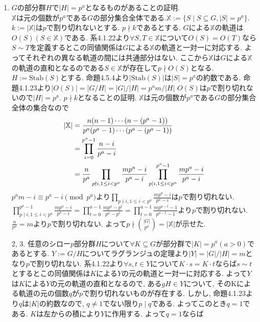 \documentclass[dvipdfmx]{jsarticle}
\theoremstyle{definition}
\numberwithin{equation}{section}
\numberwithin{props}{section}
\numberwithin{definition}{section}
\numberwithin{note}{section}
\newcommand{\XX}{\mathbb{X}}
\newcommand{\Stab}{\mathrm{Stab}}
\begin{document}
\begin{enumerate}
     \item $G$の部分群$H$で$\lvert H\rvert=p^a$となるものがあることの証明.\\
     $\XX$は元の個数が$p^a$である$G$の部分集合全体である.$\XX:=\lbrace S\mid S\subseteq G,\lvert S\rvert=p^a\rbrace$.
     $k := \lvert \XX\rvert$は$p$で割り切れないとする. $p\nmid k$であるとする.
     $G$による$\XX$の軌道は$O(S)(S\in \XX)$である. 系4.1.22より$\forall S,T\in \XX$について$O(S)=O(T)$なら$S\sim T$を定義するとこの同値関係は$G$による$\XX$の軌道と一対一に対応する.
     よってそれぞれの異なる軌道の間には共通部分はない. ここから$\XX$は$G$による$\XX$の軌道の直和となるのである$S\in \XX$が存在して$p\nmid O(S)$となる.
     $H:=\Stab(S)$とする. 命題4.5.4より$\lvert \Stab(S)\rvert$は$\lvert S\rvert=p^a$の約数である.
     命題4.1.23より$\lvert O(S)\rvert=\lvert G/H\rvert=\lvert G\rvert/\lvert H\rvert = p^am/\lvert H\rvert$ $O(S)$は$p$で割り切れないので$\lvert H\rvert=p^a$. 
     $p\nmid k$となることの証明.
     $\XX$は元の個数が$p^a$である$G$の部分集合全体の集合なので
     \begin{align}
     \lvert\XX\rvert &= \frac{n(n-1)\cdots(n-(p^a-1))}{p^a(p^a-1)\cdots (p^a - (p^a - 1))}\cr
     &= \prod_{i=0}^{p^a-1} \frac{n-i}{p^a-i}\\
     &=\frac{n}{p^a}\prod_{p\nmid i,1\leq i<p^a} \frac{mp^a-i}{p^a-i}\prod_{p\mid i,1\leq i<p^a}^{p^a-1} \frac{mp^a-i}{p^a-i}\\
     \end{align}
     $p^am - i \equiv p^a - i\pmod {p^a}$より$\prod_{p\nmid i,1\leq i<p^a} \frac{mp^a-i}{p^a-i}$は$p$で割り切れない.
     $\prod_{p\mid i,1\leq i<p^a}^{p^a-1} \frac{mp^a-i}{p^a-i}=\prod_{t=0}^{a-1} \frac{mp^a-p^t}{p^a-p^t}=\prod_{t=0}^{a-1} \frac{mp^{a-t}-1}{p^{a-t}-1}$より$p$で割り切れない.
     $\frac{n}{p^a}=m$より$p$で割り切れない.
     よって$p\nmid \binom{\lvert G\rvert}{p^a}=\lvert\XX\rvert$が示せた.
     \item[2, 3.] 任意のシロー$p$部分群$H$について$\forall K\subseteq G$が部分群で$\lvert K\rvert=p^a (a>0)$であるとする. $Y:= G/H$についてラグランジュの定理より$\lvert Y\rvert = \lvert G\rvert/\lvert H\rvert=m$となり$p$で割り切れない. 系4.1.22より$\forall s,t \in Y$について$K\cdot s=K\cdot t$ならば$s\sim t$とするとこの同値関係は$K$による$Y$の元の軌道と一対一に対応する. よって$Y$は$K$による$Y$の元の軌道の直和となるので, ある$gH\in Y$について, そのKによる軌道の元の個数$q$が$p$で割り切れないものが存在する. しかし, 命題4.1.23より$q$は$\lvert K\rvert$の約数なので, $q\neq 1$でない限り$p\mid q$である. よってこのとき$q=1$である. $K$は左からの積により$Y$に作用する. よって$q=1$ならば

\end{enumerate}
\end{document}
